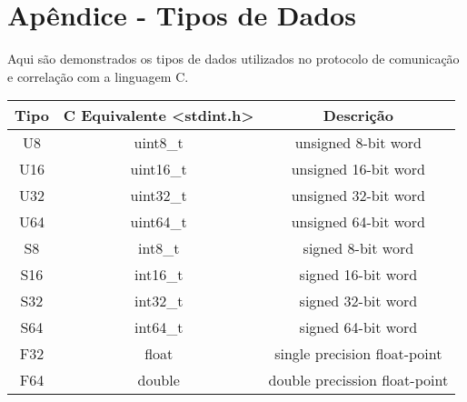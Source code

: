 \section{Apêndice - Tipos de Dados}

Aqui são demonstrados os tipos de dados utilizados no protocolo de comunicação e correlação com a linguagem C.

\begin{table}[H]
\centering
\begin{tabular}{|c|c|c|}
\hline
\textbf{Tipo} & \textbf{C Equivalente \textless{}stdint.h\textgreater{}} & \textbf{Descrição} \\ \hline
U8 & uint8\_t & unsigned 8-bit word \\
U16 & uint16\_t & unsigned 16-bit word \\
U32 & uint32\_t & unsigned 32-bit word \\
U64 & uint64\_t & unsigned 64-bit word \\ \hline
S8 & int8\_t & signed 8-bit word \\
S16 & int16\_t & signed 16-bit word \\
S32 & int32\_t & signed 32-bit word \\
S64 & int64\_t & signed 64-bit word \\ \hline
F32 & float & single precision float-point \\
F64 & double & double precission float-point \\ \hline
\end{tabular}
\end{table}